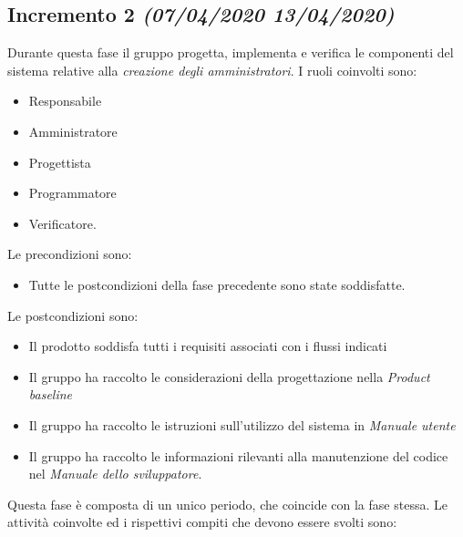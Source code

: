 \documentclass[../piano-di-progetto.tex]{subfiles}
\begin{document}
\subsection[Incremento 2]{Incremento 2 {\normalsize\normalfont\itshape(07/04/2020  13/04/2020)}}%
\label{sub:incremento_2}
Durante questa fase il gruppo progetta, implementa e verifica le componenti del sistema relative alla \textit{creazione degli amministratori}.
I ruoli coinvolti sono:
\begin{itemize}
  \item Responsabile
  \item Amministratore
  \item Progettista
  \item Programmatore
  \item Verificatore.
\end{itemize}
Le precondizioni sono:
\begin{itemize}
  \item Tutte le postcondizioni della fase precedente sono state soddisfatte.
\end{itemize}
Le postcondizioni sono:
\begin{itemize}
  \item Il prodotto soddisfa tutti i requisiti associati con i flussi indicati
  \item Il gruppo ha raccolto le considerazioni della progettazione nella \textit{Product baseline}
  \item Il gruppo ha raccolto le istruzioni sull'utilizzo del sistema in \textit{Manuale utente}
  \item Il gruppo ha raccolto le informazioni rilevanti alla manutenzione del codice nel \textit{Manuale dello sviluppatore}.
\end{itemize}
Questa fase è composta di un unico periodo, che coincide con la fase stessa.
Le attività coinvolte ed i rispettivi compiti che devono essere svolti sono:
\end{document}
